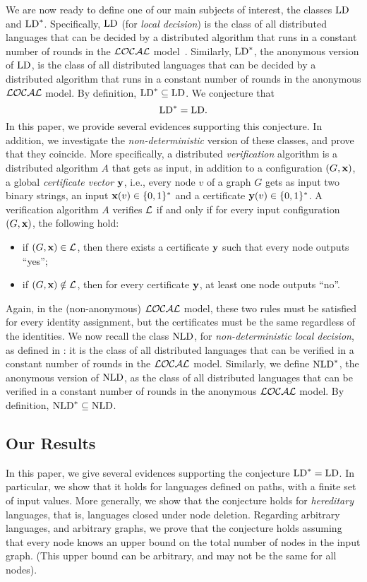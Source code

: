 \documentclass{llncs}
\newcommand{\local}{{\cal LOCAL}}
\newcommand{\inp}{\mbox{\rm\bf x}}
\newcommand{\certif}{\mbox{\rm\bf y}}
\newcommand{\LD}{\mbox{\rm LD}}
\newcommand{\NLD}{\mbox{\rm NLD}}
\def\cL{{\cal L}}
\begin{document}
We are now ready to define one of our main subjects of interest, the classes $\LD$ and $\LD^*$. Specifically, $\LD$ (for \emph{local decision}) is the class of all distributed languages that can be decided by a  distributed algorithm that runs in a constant number of  rounds in the $\local$ model~\cite{FKP11}. Similarly, $\LD^*$, the anonymous version of $\LD$, is the class of all distributed languages that can be decided by a  distributed algorithm that runs in a constant number of rounds in the anonymous $\local$ model. By definition, $\LD^*\subseteq \LD$. We conjecture that $$\LD^*=\LD.$$ In this paper, we provide several evidences supporting this conjecture. In addition, we investigate the \emph{non-deterministic} version of these classes, and prove that they coincide. More specifically, a distributed {\em verification} algorithm is a distributed algorithm $A$ that gets as input, in addition to a configuration $(G,\inp)$, a global {\em certificate vector} $\certif$, i.e., every node $v$ of a graph $G$ gets as input two binary strings, an input $\inp(v)\in\{0,1\}^*$ and a certificate $\certif(v)\in\{0,1\}^*$. A verification algorithm $A$ verifies $\cL$ if and only if for every input configuration $(G,\inp)$, the following hold: 
\begin{itemize}
\item if $(G,\inp)\in \cL$, then there exists a certificate $\certif$ such that every node outputs ``yes''; 
\item if $(G,\inp)\notin \cL$, then for every certificate $\certif$, at least one node outputs ``no''.
\end{itemize}
Again, in the (non-anonymous) $\local$ model, these two rules must be satisfied for every identity assignment, but the certificates must be the same regardless of the identities.
We now recall the class $\NLD$, for \emph{non-deterministic local decision}, as defined in \cite{FKP11}: it is the class of all distributed languages that can be verified in a constant number of rounds in the $\local$ model. Similarly, we define $\NLD^*$, the anonymous version of $\NLD$, as the class of all distributed languages that can be verified in a constant number of rounds in the anonymous $\local$ model. By definition, $\NLD^*\subseteq \NLD$. 

\subsection{Our Results}


In this paper, we give several evidences supporting the conjecture $\LD^*=\LD$. In particular, we show that it holds for languages defined on paths, with a finite set of input values. More generally, we show that the conjecture holds for \emph{hereditary} languages, that is, languages closed under node deletion. Regarding arbitrary languages, and arbitrary graphs, we prove that the conjecture holds assuming that every node knows an  upper bound on the total number of nodes in the input graph. (This upper bound can be arbitrary, and may not be the same for all nodes). 
\end{document}
